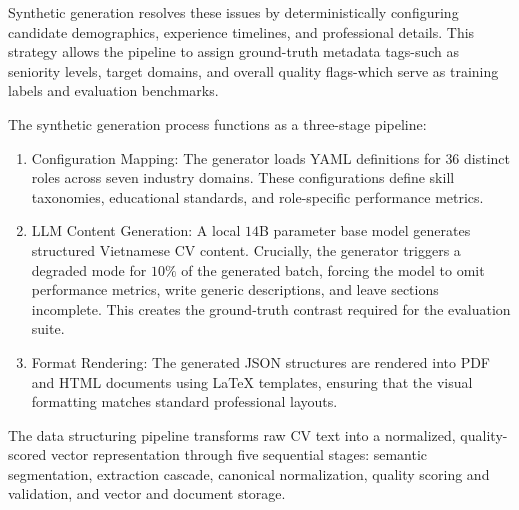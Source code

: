 \documentclass[12pt, a4paper]{report}
\begin{document}
Synthetic generation resolves these issues by deterministically configuring candidate demographics, experience timelines, and professional details. This strategy allows the pipeline to assign ground-truth metadata tags-such as seniority levels, target domains, and overall quality flags-which serve as training labels and evaluation benchmarks.

\vspace{0.3cm}

The synthetic generation process functions as a three-stage pipeline:
\begin{enumerate}
    \item Configuration Mapping: The generator loads YAML definitions for $36$ distinct roles across seven industry domains. These configurations define skill taxonomies, educational standards, and role-specific performance metrics.
    \item LLM Content Generation: A local $14$B parameter base model generates structured Vietnamese CV content. Crucially, the generator triggers a degraded mode for $10\%$ of the generated batch, forcing the model to omit performance metrics, write generic descriptions, and leave sections incomplete. This creates the ground-truth contrast required for the evaluation suite.
    \item Format Rendering: The generated JSON structures are rendered into PDF and HTML documents using LaTeX templates, ensuring that the visual formatting matches standard professional layouts.
\end{enumerate}

\vspace{0.6cm}
\vspace{0.4cm}

The data structuring pipeline transforms raw CV text into a normalized, quality-scored vector representation through five sequential stages: semantic segmentation, extraction cascade, canonical normalization, quality scoring and validation, and vector and document storage.

\vspace{0.3cm}
\end{document}
